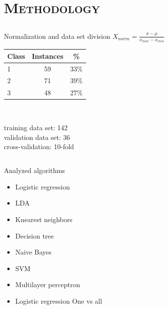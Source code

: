 \documentclass[xcolor=x11names,compress]{beamer}
\renewcommand{\(}{\begin{columns}}
\renewcommand{\)}{\end{columns}}
\newcommand{\<}[1]{\begin{column}{#1}}
\renewcommand{\>}{\end{column}}
\begin{document}
\section{\scshape Methodology}
\subsection{}
\begin{frame}{Normalization and data set division}
	$X_{norm} = \frac{x - \mu}{x_{max} -x_{min}}$ \\
	
    \begin{table}[t]
    \begin{tabular}{|l|c|c|}
      \hline 
      Class &  Instances & \%\\
      \hline 
      1 & 59 & 33\%\\
      \hline
      2 & 71 & 39\%\\
      \hline
      3 & 48 & 27\%\\
      \hline
    \end{tabular} \\
    \end{table}

training data set: 142 \\
validation data set: 36 \\
cross-validation: 10-fold \\

\end{frame}

\subsection{}
\begin{frame}{Analyzed algorithms}
	\begin{itemize}
	\item Logistic regression
	\item LDA
	\item K\dywiz nearest neighbors
	\item Decision tree
	\item Naive Bayes
	\item SVM
	\item Multilayer perceptron
	\item Logistic regression One vs all

\end{itemize}
\end{frame}
\end{document}
